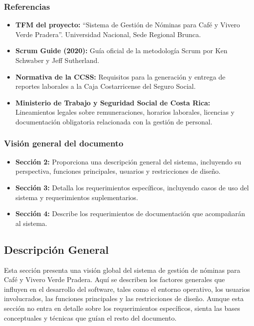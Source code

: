 \subsubsection*{Referencias}

\begin{itemize}
	\item \textbf{TFM del proyecto:} “Sistema de Gestión de Nóminas para Café y Vivero Verde Pradera”. Universidad Nacional, Sede Regional Brunca.

	\item \textbf{Scrum Guide (2020):} Guía oficial de la metodología Scrum por Ken Schwaber y Jeff Sutherland.

	\item \textbf{Normativa de la CCSS:} Requisitos para la generación y entrega de reportes laborales a la Caja Costarricense del Seguro Social.

	\item \textbf{Ministerio de Trabajo y Seguridad Social de Costa Rica:} Lineamientos legales sobre remuneraciones, horarios laborales, licencias y documentación obligatoria relacionada con la gestión de personal.
\end{itemize}


\subsubsection*{Visión general del documento}
\begin{itemize}
	\item \textbf{Sección 2:} Proporciona una descripción general del sistema, incluyendo su perspectiva, funciones principales, usuarios y restricciones de diseño.

	\item \textbf{Sección 3:} Detalla los requerimientos específicos, incluyendo casos de uso del sistema y requerimientos suplementarios.

	\item \textbf{Sección 4:} Describe los requerimientos de documentación que acompañarán al sistema.

\end{itemize}

\subsection*{Descripción General}

Esta sección presenta una visión global del sistema de gestión de nóminas para
Café y Vivero Verde Pradera. Aquí se describen los factores generales que influyen en
el desarrollo del software, tales como el entorno operativo, los usuarios involucrados,
las funciones principales y las restricciones de diseño. Aunque esta sección no entra en
detalle sobre los requerimientos específicos, sienta las bases conceptuales y técnicas que
guían el resto del documento.

